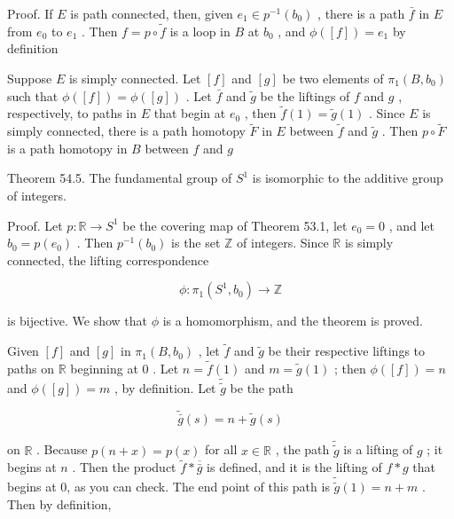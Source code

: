 \documentclass[10pt]{article}
\begin{document}
Proof. If \(E\) is path connected, then, given \({e}_{1} \in  {p}^{-1}\left( {b}_{0}\right)\) , there is a path \(\bar{f}\) in \(E\) from \({e}_{0}\) to \({e}_{1}\) . Then \(f = p \circ  \widetilde{f}\) is a loop in \(B\) at \({b}_{0}\) , and \(\phi \left( \left\lbrack  f\right\rbrack  \right)  = {e}_{1}\) by definition

Suppose \(E\) is simply connected. Let \(\left\lbrack  f\right\rbrack\) and \(\left\lbrack  g\right\rbrack\) be two elements of \({\pi }_{1}\left( {B,{b}_{0}}\right)\) such that \(\phi \left( \left\lbrack  f\right\rbrack  \right)  = \phi \left( \left\lbrack  g\right\rbrack  \right)\) . Let \(\bar{f}\) and \(\widetilde{g}\) be the liftings of \(f\) and \(g\) , respectively, to paths in \(E\) that begin at \({e}_{0}\) , then \(\widetilde{f}\left( 1\right)  = \widetilde{g}\left( 1\right)\) . Since \(E\) is simply connected, there is a path homotopy \(\widetilde{F}\) in \(E\) between \(\widetilde{f}\) and \(\widetilde{g}\) . Then \(p \circ  \widetilde{F}\) is a path homotopy in \(B\) between \(f\) and \(g\)

Theorem 54.5. The fundamental group of \({S}^{1}\) is isomorphic to the additive group of integers.

Proof. Let \(p : \mathbb{R} \rightarrow  {S}^{1}\) be the covering map of Theorem 53.1, let \({e}_{0} = 0\) , and let \({b}_{0} = p\left( {e}_{0}\right)\) . Then \({p}^{-1}\left( {b}_{0}\right)\) is the set \(\mathbb{Z}\) of integers. Since \(\mathbb{R}\) is simply connected, the lifting correspondence

\[
\phi  : {\pi }_{1}\left( {{S}^{1},{b}_{0}}\right)  \rightarrow  \mathbb{Z}
\]

is bijective. We show that \(\phi\) is a homomorphism, and the theorem is proved.

Given \(\left\lbrack  f\right\rbrack\) and \(\left\lbrack  g\right\rbrack\) in \({\pi }_{1}\left( {B,{b}_{0}}\right)\) , let \(\widetilde{f}\) and \(\widetilde{g}\) be their respective liftings to paths on \(\mathbb{R}\) beginning at 0 . Let \(n = \widetilde{f}\left( 1\right)\) and \(m = \widetilde{g}\left( 1\right)\) ; then \(\phi \left( \left\lbrack  f\right\rbrack  \right)  = n\) and \(\phi \left( \left\lbrack  g\right\rbrack  \right)  = m\) , by definition. Let \(\widetilde{\widetilde{g}}\) be the path

\[
\widetilde{\bar{g}}\left( s\right)  = n + \widetilde{g}\left( s\right)
\]

on \(\mathbb{R}\) . Because \(p\left( {n + x}\right)  = p\left( x\right)\) for all \(x \in  \mathbb{R}\) , the path \(\widetilde{\widetilde{g}}\) is a lifting of \(g\) ; it begins at \(n\) . Then the product \(\widetilde{f} * \overline{\bar{g}}\) is defined, and it is the lifting of \(f * g\) that begins at 0, as you can check. The end point of this path is \(\widetilde{\widetilde{g}}\left( 1\right)  = n + m\) . Then by definition,
\end{document}
